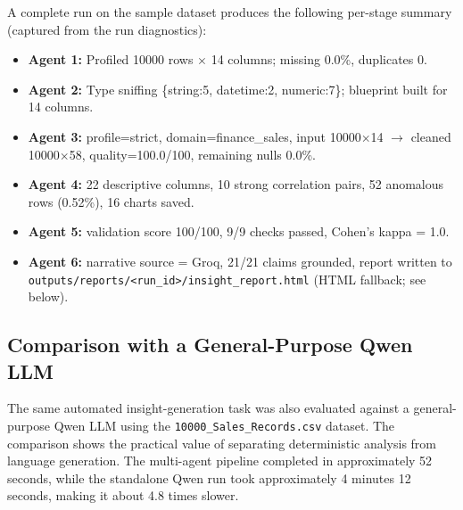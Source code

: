 \documentclass[12pt,a4paper,openany]{report}
\begin{document}
A complete run on the sample dataset produces the following per-stage summary (captured from the run diagnostics):

\begin{itemize}
	\item \textbf{Agent 1:} Profiled 10000 rows $\times$ 14 columns; missing 0.0\%, duplicates 0.
	\item \textbf{Agent 2:} Type sniffing \{string:5, datetime:2, numeric:7\}; blueprint built for 14 columns.
	\item \textbf{Agent 3:} profile=strict, domain=finance\_sales, input 10000$\times$14 $\rightarrow$ cleaned 10000$\times$58, quality=100.0/100, remaining nulls 0.0\%.
	\item \textbf{Agent 4:} 22 descriptive columns, 10 strong correlation pairs, 52 anomalous rows (0.52\%), 16 charts saved.
	\item \textbf{Agent 5:} validation score 100/100, 9/9 checks passed, Cohen's kappa = 1.0.
	\item \textbf{Agent 6:} narrative source = Groq, 21/21 claims grounded, report written to \texttt{outputs/reports/<run\_id>/insight\_report.html} (HTML fallback; see below).
\end{itemize}

\subsection{Comparison with a General-Purpose Qwen LLM}

The same automated insight-generation task was also evaluated against a general-purpose Qwen LLM using the \texttt{10000\_Sales\_Records.csv} dataset. The comparison shows the practical value of separating deterministic analysis from language generation. The multi-agent pipeline completed in approximately 52 seconds, while the standalone Qwen run took approximately 4 minutes 12 seconds, making it about 4.8 times slower.
\end{document}
